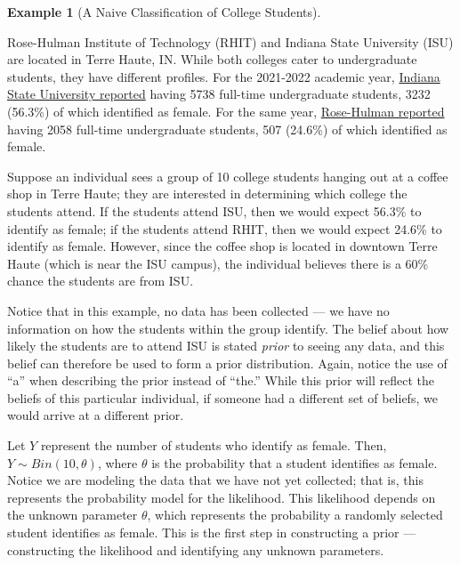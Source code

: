 \documentclass[
  letterpaper,
  DIV=11,
  numbers=noendperiod]{scrreprt}
\theoremstyle{definition}
\newtheorem{example}{Example}[chapter]
\theoremstyle{definition}
\theoremstyle{plain}
\theoremstyle{remark}
\begin{document}
\begin{example}[A Naive Classification of College
Students]\protect\hypertarget{exm-naive}{}\label{exm-naive}

Rose-Hulman Institute of Technology (RHIT) and Indiana State University
(ISU) are located in Terre Haute, IN. While both colleges cater to
undergraduate students, they have different profiles. For the 2021-2022
academic year,
\href{https://irt2.indstate.edu/cms7/ir/assets/File/CDS22.pdf}{Indiana
State University reported} having 5738 full-time undergraduate students,
3232 (56.3\%) of which identified as female. For the same year,
\href{https://www.rose-hulman.edu/academics/academic-affairs/irpa/reports/CDS_AY_2021-22.pdf}{Rose-Hulman
reported} having 2058 full-time undergraduate students, 507 (24.6\%) of
which identified as female.

Suppose an individual sees a group of 10 college students hanging out at
a coffee shop in Terre Haute; they are interested in determining which
college the students attend. If the students attend ISU, then we would
expect 56.3\% to identify as female; if the students attend RHIT, then
we would expect 24.6\% to identify as female. However, since the coffee
shop is located in downtown Terre Haute (which is near the ISU campus),
the individual believes there is a 60\% chance the students are from
ISU.

\end{example}

Notice that in this example, no data has been collected --- we have no
information on how the students within the group identify. The belief
about how likely the students are to attend ISU is stated \emph{prior}
to seeing any data, and this belief can therefore be used to form a
prior distribution. Again, notice the use of ``a'' when describing the
prior instead of ``the.'' While this prior will reflect the beliefs of
this particular individual, if someone had a different set of beliefs,
we would arrive at a different prior.

Let \(Y\) represent the number of students who identify as female. Then,
\(Y \sim Bin(10, \theta)\), where \(\theta\) is the probability that a
student identifies as female. Notice we are modeling the data that we
have not yet collected; that is, this represents the probability model
for the likelihood. This likelihood depends on the unknown parameter
\(\theta\), which represents the probability a randomly selected student
identifies as female. This is the first step in constructing a prior ---
constructing the likelihood and identifying any unknown parameters.
\end{document}
